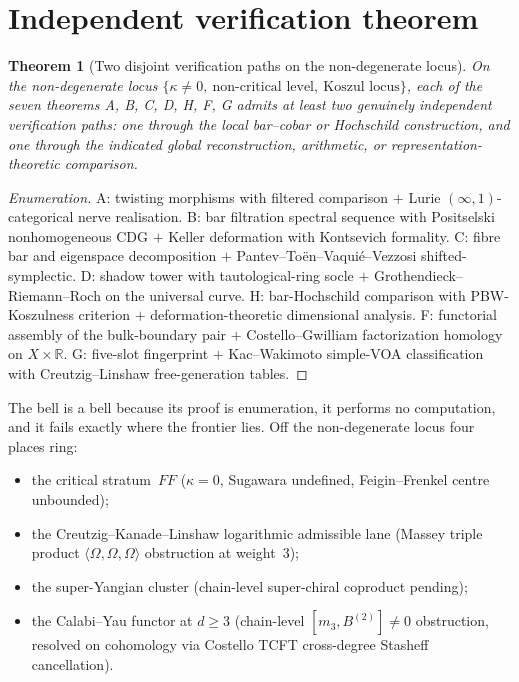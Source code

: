 \documentclass[11pt]{article}
\providecommand{\bR}{\mathbb{R}}
\newtheorem{theorem}{Theorem}[section]
\begin{document}
\section{Independent verification theorem}

\begin{theorem}[Two disjoint verification paths on the non-degenerate locus]
On the non-degenerate locus
$\{\kappa\ne 0,\ \text{non-critical level},\ \text{Koszul locus}\}$,
each of the seven theorems A, B, C, D, H, F, G admits at least two
genuinely independent verification paths: one through the local
bar--cobar or Hochschild construction, and one through the indicated
global reconstruction, arithmetic, or representation-theoretic
comparison.
\end{theorem}

\begin{proof}[Enumeration]
A: twisting morphisms with filtered comparison $+$ Lurie
$(\infty,1)$-categorical nerve realisation.
B: bar filtration spectral sequence with Positselski nonhomogeneous
CDG $+$ Keller deformation with Kontsevich formality.
C: fibre bar and eigenspace decomposition $+$
Pantev--To\"en--Vaqui\'e--Vezzosi shifted-symplectic.
D: shadow tower with tautological-ring socle $+$
Grothendieck--Riemann--Roch on the universal curve.
H: bar-Hochschild comparison with PBW-Koszulness criterion $+$
deformation-theoretic dimensional analysis.
F: functorial assembly of the bulk-boundary pair $+$
Costello--Gwilliam factorization homology on $X\times\bR$.
G: five-slot fingerprint $+$ Kac--Wakimoto simple-VOA classification
with Creutzig--Linshaw free-generation tables.
\end{proof}

The bell is a bell because its proof is enumeration, it performs no
computation, and it fails exactly where the frontier lies. Off the
non-degenerate locus four places ring:
\begin{itemize}[nosep]
\item the critical stratum~$FF$ \textup{(}$\kappa = 0$, Sugawara
undefined, Feigin--Frenkel centre unbounded\textup{)};
\item the Creutzig--Kanade--Linshaw logarithmic admissible lane
\textup{(}Massey triple product
$\langle\Omega,\Omega,\Omega\rangle$ obstruction at weight~$3$\textup{)};
\item the super-Yangian cluster
\textup{(}chain-level super-chiral coproduct pending\textup{)};
\item the Calabi--Yau functor at $d\ge 3$
\textup{(}chain-level $[m_3, B^{(2)}]\ne 0$ obstruction, resolved on
cohomology via Costello TCFT cross-degree Stasheff cancellation\textup{)}.
\end{itemize}
\end{document}
